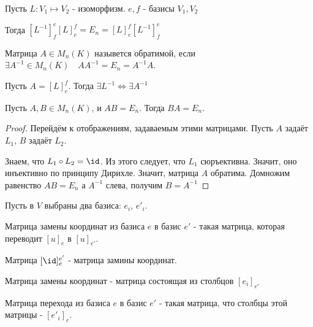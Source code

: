 \begin{statement} \thmslashn

    Пусть $L : V_1 \mapsto V_2$ - изоморфизм. $e, f$ - базисы $V_1, V_2$

    Тогда $[L^{-1}]_{f}^{e}[L]_{e}^{f} = E_{n} = \left[L\right]_{e}^{f}\left[L^{-1}\right]_{f}^{e}$
\end{statement}
\begin{definition} \thmslashn 

    Матрица $A\in M_{n}(K)$ назывется обратимой, если $\exists{A^{-1}\in M_{n}(K)}\quad A A^{-1} = E_{n} = A^{-1}A$.
\end{definition}
\begin{remark} \thmslashn

    Пусть $A = [L]_{e}^{f}$. Тогда $\exists{L^{-1}}\iff \exists{A^{-1}} $
\end{remark}
\begin{statement} \thmslashn

    Пусть $A, B\in M_{n}(K)$, и $AB = E_{n}$. Тогда $BA = E_{n}$.

    \begin{proof} \thmslashn
    
        Перейдём к отображениям, задаваемым этими матрицами. Пусть $A$ задаёт $L_1$, $B$ задаёт $L_2$.

        Знаем, что $L_1 \circ L_2 = \id$. Из этого следует, что $L_1$ сюръективна. Значит, оно инъективно по принципу Дирихле. Значит, матрица $A$ обратима. Домножим равенство  $AB = E_{n}$ а $A^{-1}$ слева, получим $B = A^{-1}$ 
    \end{proof}
\end{statement}
\begin{definition} \thmslashn 

    Пусть в $V$ выбраны два базиса: $e_{i}$, $e'_{i}$.

    Матрица замены координат из базиса $e$ в базис $e'$ - такая матрица, которая переводит $[u]_{e}$ в $[u]_{e'}$.
\end{definition}
\begin{statement} \thmslashn

    Матрица $[\id]_{e}^{e'}$ - матрица замины координат.
\end{statement}
\begin{statement} \thmslashn

    Матрица замены координат - матрица состоящая из столбцов $\left[e_{i}\right]_{e'}$
\end{statement}
\begin{definition} \thmslashn 

    Матрица перехода из базиса $e$ в базис $e'$ - такая матрица, что столбцы этой матрицы - $\left[e'_{i}\right]_{e}$.
\end{definition}
